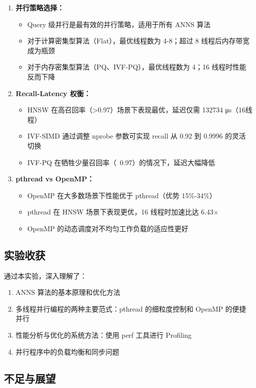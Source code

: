 \documentclass[a4paper]{article}
\begin{document}
\begin{enumerate}
\item \textbf{并行策略选择：}
\begin{itemize}
\item Query 级并行是最有效的并行策略，适用于所有 ANNS 算法
\item 对于计算密集型算法（Flat），最优线程数为 4-8；超过 8 线程后内存带宽成为瓶颈
\item 对于内存密集型算法（PQ、IVF-PQ），最优线程数为 4；16 线程时性能反而下降
\end{itemize}

\item \textbf{Recall-Latency 权衡：}
\begin{itemize}
\item HNSW 在高召回率（>0.97）场景下表现最优，延迟仅需 132734 μs（16线程）
\item IVF-SIMD 通过调整 nprobe 参数可实现 recall 从 0.92 到 0.9996 的灵活切换
\item IVF-PQ 在牺牲少量召回率（~0.97）的情况下，延迟大幅降低
\end{itemize}

\item \textbf{pthread vs OpenMP：}
\begin{itemize}
\item OpenMP 在大多数场景下性能优于 pthread（优势 15\%-34\%）
\item pthread 在 HNSW 场景下表现更优，16 线程时加速比达 6.43×
\item OpenMP 的动态调度对不均匀工作负载的适应性更好
\end{itemize}
\end{enumerate}

\subsection{实验收获}

通过本实验，深入理解了：
\begin{enumerate}
\item ANNS 算法的基本原理和优化方法
\item 多线程并行编程的两种主要范式：pthread 的细粒度控制和 OpenMP 的便捷并行
\item 性能分析与优化的系统方法：使用 perf 工具进行 Profiling
\item 并行程序中的负载均衡和同步问题
\end{enumerate}

\subsection{不足与展望}
\end{document}
